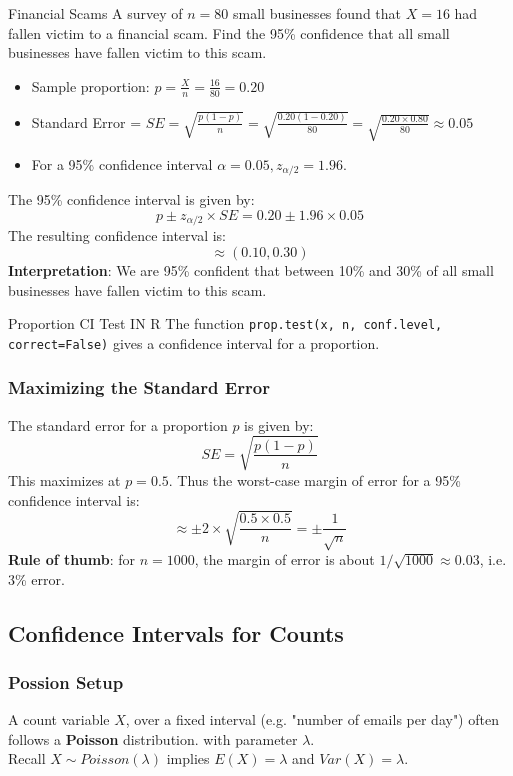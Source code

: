 \documentclass[9pt]{extarticle}
\begin{document}
\begin{examplebox}{Financial Scams}{}
    A survey of $n=80$ small businesses found that $X = 16$ had fallen victim to a financial scam. Find the 95\% confidence that all small businesses have fallen victim to this scam. \\[2ex]

    \begin{itemize}
        \item Sample proportion: $p = \frac{X}{n} = \frac{16}{80} = 0.20$
        \item Standard Error = $SE = \sqrt{\frac{p(1 - p)}{n}} = \sqrt{\frac{0.20(1 - 0.20)}{80}} = \sqrt{\frac{0.20 \times 0.80}{80}} \approx 0.05$
        \item For a 95\% confidence interval $\alpha = 0.05, z_{\alpha/2} = 1.96$.
    \end{itemize}
    The 95\% confidence interval is given by:
    $$p \pm z_{\alpha/2} \times SE = 0.20 \pm 1.96 \times 0.05$$
    The resulting confidence interval is:
    $$\approx (0.10, 0.30)$$
    \textbf{Interpretation}: We are 95\% confident that between 10\% and 30\% of all small businesses have fallen victim to this scam.
\end{examplebox}
\begin{conceptbox}{Proportion CI Test IN R}{}
    The function \texttt{prop.test(x, n, conf.level, correct=False)}  gives a confidence interval for a proportion.
\end{conceptbox}
\pagebreak
\subsubsection{Maximizing the Standard Error}
The standard error for a proportion $p$ is given by:
$$SE = \sqrt{\frac{p(1 - p)}{n}}$$
This maximizes at $p = 0.5$. Thus the worst-case margin of error for a 95\% confidence interval is:
$$\approx \pm 2 \times \sqrt{\frac{0.5\times0.5}{n}} = \pm \frac{1}{\sqrt{n}}$$
\textbf{Rule of thumb}: for $n = 1000$, the margin of error is about $1/\sqrt{1000} \approx 0.03$, i.e. 3\% error.
\subsection{Confidence Intervals for Counts}
\subsubsection{Possion Setup}
A count variable $X$, over a fixed interval (e.g. "number of emails per day") often follows a \textbf{Poisson} distribution. with parameter $\lambda$.  \\
Recall $X \sim Poisson(\lambda)$ implies $E(X) = \lambda$ and $Var(X) = \lambda$.
\end{document}
